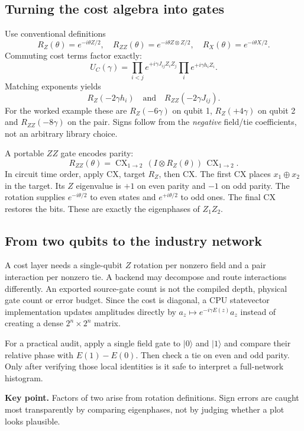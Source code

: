 \documentclass[11pt,letterpaper]{article}
\newcommand{\ket}[1]{\lvert #1\rangle}
\newcommand{\takeaway}[1]{\par\smallskip\textbf{Key point.} #1\par}
\begin{document}
\subsection{Turning the cost algebra into gates}\label{sec:gates}
Use conventional definitions
\begin{equation}
 R_Z(\theta)=e^{-i\theta Z/2},\quad
 R_{ZZ}(\theta)=e^{-i\theta Z\otimes Z/2},\quad
 R_X(\theta)=e^{-i\theta X/2}.
\end{equation}
Commuting cost terms factor exactly:
\begin{equation}
 U_C(\gamma)=\prod_{i<j}e^{+i\gamma J_{ij}Z_iZ_j}
 \prod_i e^{+i\gamma h_iZ_i}.
\end{equation}
Matching exponents yields
\begin{equation}
 \boxed{R_Z(-2\gamma h_i)\quad\text{and}\quad R_{ZZ}(-2\gamma J_{ij}).}
\end{equation}
For the worked example these are $R_Z(-6\gamma)$ on qubit 1, $R_Z(+4\gamma)$ on qubit 2 and $R_{ZZ}(-8\gamma)$ on the pair. Signs follow from the \emph{negative} field/tie coefficients, not an arbitrary library choice.

A portable $ZZ$ gate encodes parity:
\begin{equation}
 R_{ZZ}(\theta)=\operatorname{CX}_{1\to2}\,
 (I\otimes R_Z(\theta))\,\operatorname{CX}_{1\to2}.\label{eq:cnot}
\end{equation}
In circuit time order, apply CX, target $R_Z$, then CX. The first CX places $x_1\oplus x_2$ in the target. Its $Z$ eigenvalue is $+1$ on even parity and $-1$ on odd parity. The rotation supplies $e^{-i\theta/2}$ to even states and $e^{+i\theta/2}$ to odd ones. The final CX restores the bits. These are exactly the eigenphases of $Z_1Z_2$.

\subsection{From two qubits to the industry network}
A cost layer needs a single-qubit $Z$ rotation per nonzero field and a pair interaction per nonzero tie. A backend may decompose and route interactions differently. An exported source-gate count is not the compiled depth, physical gate count or error budget. Since the cost is diagonal, a CPU statevector implementation updates amplitudes directly by $a_z\mapsto e^{-i\gamma E(z)}a_z$ instead of creating a dense $2^n\times2^n$ matrix.

For a practical audit, apply a single field gate to $\ket0$ and $\ket1$ and compare their relative phase with $E(1)-E(0)$. Then check a tie on even and odd parity. Only after verifying those local identities is it safe to interpret a full-network histogram.
\takeaway{Factors of two arise from rotation definitions. Sign errors are caught most transparently by comparing eigenphases, not by judging whether a plot looks plausible.}
\end{document}
